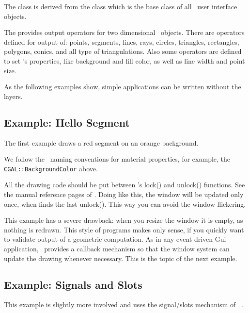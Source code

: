 The class  is derived from the class 
which is the base class of all \qt\ user interface objects. 


The  provides output operators for two dimensional \cgal\
objects. There are operators defined for output of: points, segments, 
lines, rays, circles, triangles, rectangles, polygons, conics,  and all type of
triangulations. Also some operators are defined to set
's properties, like background and fill color, as
well as line width and point size.

As the following examples show, simple applications can be written
without the layers.

\subsection{Example: Hello Segment}
The first example draws a red segment on an orange background.

We follow the \qt\ naming conventions for material properties, for
example, the {\tt CGAL::BackgroundColor} above.

All the drawing code should be put between 's lock() and
unlock() functions. See the manual reference pages of
. Doing like this, the window will be updated only
once, when \ccStyle{Qt\_widget} finds the last unlock(). This way you
can avoid the window flickering.

This example has a severe drawback: when you resize the window it is
empty, as nothing is redrawn. This style of programs makes
only sense, if you quickly want to validate output of a geometric
computation. As in any event driven {\sc Gui} application,
 \qt\  provides a callback mechanism so
that the window system can update the drawing
whenever necessary. This is the topic of the next example.

\subsection{Example: Signals and Slots}

This example is slightly more involved and uses  the
signal/slots mechanism of \qt\ .

